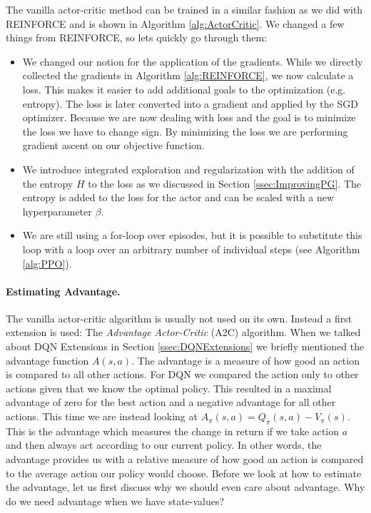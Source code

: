 The vanilla actor-critic method can be trained in a similar fashion as we did with REINFORCE and is shown in Algorithm \ref{alg:ActorCritic}. We changed a few things from REINFORCE, so lets quickly go through them:
\begin{itemize}
  \item We changed our notion for the application of the gradients. While we directly collected the gradients in Algorithm \ref{alg:REINFORCE}, we now calculate a loss. This makes it easier to add additional goals to the optimization (e.g. entropy). The loss is later converted into a gradient and applied by the SGD optimizer. Because we are now dealing with loss and the goal is to minimize the loss we have to change sign. By minimizing the loss we are performing gradient ascent on our objective function.
  \item We introduce integrated exploration and regularization with the addition of the entropy $H$ to the loss as we discussed in Section \ref{ssec:ImprovingPG}. The entropy is added to the loss for the actor and can be scaled with a new hyperparameter $\beta$.
  \item We are still using a for-loop over episodes, but it is possible to substitute this loop with a loop over an arbitrary number of individual steps (see Algorithm \ref{alg:PPO}).   
\end{itemize}

\paragraph{Estimating Advantage.}
The vanilla actor-critic algorithm is usually not used on its own. Instead a first extension is used: The \textit{Advantage Actor-Critic} (A2C) algorithm. When we talked about DQN Extensions in Section \ref{ssec:DQNExtensions} we briefly mentioned the advantage function $A(s, a)$. The advantage is a measure of how good an action is compared to all other actions. For DQN we compared the action only to other actions given that we know the optimal policy. This resulted in a maximal advantage of zero for the best action and a negative advantage for all other actions. This time we are instead looking at $A_\pi(s, a) = Q_\pi(s, a) - V_\pi(s)$. This is the advantage which measures the change in return if we take action $a$ and then always act according to our current policy. In other words, the advantage provides us with a relative measure of how good an action is compared to the average action our policy would choose. Before we look at how to estimate the advantage, let us first discuss why we should even care about advantage. Why do we need advantage when we have state-values?


